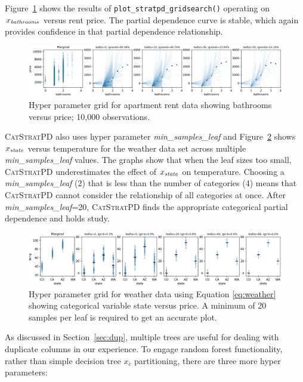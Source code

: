 \documentclass[12pt]{article}
\newcommand{\secref}[1]{Section~\ref{#1}}
\newcommand{\figref}[1]{Figure~\ref{#1}}
\newcommand{\cspd}{\fontfamily{cmr}\textsc{\small CatStratPD}}
\newcommand{\xnc}{$x_{\overline{c}}$}
\begin{document}
\figref{fig:bath_grid} shows the results of {\tt plot\_stratpd\_gridsearch()} operating on $x_{\it bathrooms}$ versus rent price. The partial dependence curve is stable, which again provides confidence in that partial dependence relationship.

\begin{figure}[htbp]
\begin{center}
\includegraphics[scale=0.5]{images/bathrooms_meta.png}
\caption{Hyper parameter grid for apartment rent data showing bathrooms versus price; 10,000 observations.}
\label{fig:bath_grid}
\end{center}
\end{figure}

\cspd{} also uses hyper parameter {\it min\_samples\_leaf} and \figref{fig:weather_grid} shows $x_{\it state}$ versus temperature for the weather data set across multiple {\it min\_samples\_leaf} values.  The graphs show that when the leaf sizes too small, \cspd{} underestimates the effect of $x_{\it state}$ on temperature. Choosing a {\it min\_samples\_leaf} (2) that is less than the number of categories (4) means that \cspd{} cannot consider the relationship of all categories at once. After {\it min\_samples\_leaf}=20, \cspd{} finds the appropriate categorical partial dependence and holds study.

\begin{figure}[htbp]
\begin{center}
\includegraphics[scale=0.55]{images/state_temp_meta.png}
\caption{Hyper parameter grid for weather data using Equation \eqref{eq:weather} showing categorical variable state versus price.  A minimum of 20 samples per leaf is required to get an accurate plot.}
\label{fig:weather_grid}
\end{center}
\end{figure}


As discussed in \secref{sec:dup}, multiple trees are useful for dealing with duplicate columns in our experience. To engage random forest functionality, rather than simple decision tree \xnc{} partitioning, there are three more hyper parameters:
\end{document}
